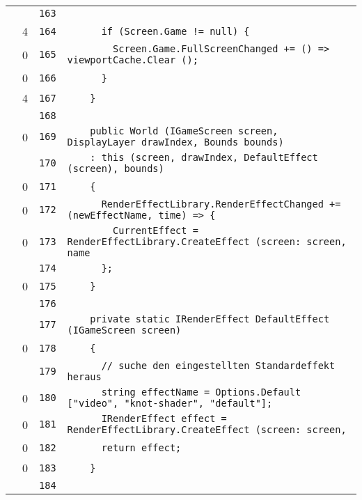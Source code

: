\documentclass[a4paper,10pt]{article}
\begin{document}
\begin{longtable}[l]{lrrl}
\cellcolor{gray} &  & \verb~163~ & \verb~~\\
\cellcolor{green} & 4 & \verb~164~ & \verb~      if (Screen.Game != null) {~\\
\cellcolor{red} & 0 & \verb~165~ & \verb~        Screen.Game.FullScreenChanged += () => viewportCache.Clear ();~\\
\cellcolor{red} & 0 & \verb~166~ & \verb~      }~\\
\cellcolor{green} & 4 & \verb~167~ & \verb~    }~\\
\cellcolor{gray} &  & \verb~168~ & \verb~~\\
\cellcolor{red} & 0 & \verb~169~ & \verb~    public World (IGameScreen screen, DisplayLayer drawIndex, Bounds bounds)~\\
\cellcolor{gray} &  & \verb~170~ & \verb~    : this (screen, drawIndex, DefaultEffect (screen), bounds)~\\
\cellcolor{red} & 0 & \verb~171~ & \verb~    {~\\
\cellcolor{red} & 0 & \verb~172~ & \verb~      RenderEffectLibrary.RenderEffectChanged += (newEffectName, time) => {~\\
\cellcolor{red} & 0 & \verb~173~ & \verb~        CurrentEffect = RenderEffectLibrary.CreateEffect (screen: screen, name~\\
\cellcolor{gray} &  & \verb~174~ & \verb~      };~\\
\cellcolor{red} & 0 & \verb~175~ & \verb~    }~\\
\cellcolor{gray} &  & \verb~176~ & \verb~~\\
\cellcolor{gray} &  & \verb~177~ & \verb~    private static IRenderEffect DefaultEffect (IGameScreen screen)~\\
\cellcolor{red} & 0 & \verb~178~ & \verb~    {~\\
\cellcolor{gray} &  & \verb~179~ & \verb~      // suche den eingestellten Standardeffekt heraus~\\
\cellcolor{red} & 0 & \verb~180~ & \verb~      string effectName = Options.Default ["video", "knot-shader", "default"];~\\
\cellcolor{red} & 0 & \verb~181~ & \verb~      IRenderEffect effect = RenderEffectLibrary.CreateEffect (screen: screen,~\\
\cellcolor{red} & 0 & \verb~182~ & \verb~      return effect;~\\
\cellcolor{red} & 0 & \verb~183~ & \verb~    }~\\
\cellcolor{gray} &  & \verb~184~ & \verb~~\\

\end{longtable}
\end{document}
